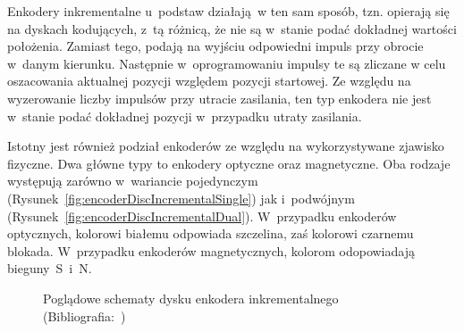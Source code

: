 Enkodery inkrementalne u~podstaw działają~w ten sam sposób, tzn. opierają się na dyskach kodujących, z~tą różnicą, że nie są w~stanie podać dokładnej wartości położenia. Zamiast tego, podają na wyjściu odpowiedni impuls przy obrocie w~danym kierunku. Następnie w~oprogramowaniu impulsy te są zliczane w celu oszacowania aktualnej pozycji względem pozycji startowej. Ze względu na wyzerowanie liczby impulsów przy utracie zasilania, ten typ enkodera nie jest w~stanie podać dokładnej pozycji w~przypadku utraty zasilania.

Istotny jest również podział enkoderów ze względu na wykorzystywane zjawisko fizyczne. Dwa główne typy to enkodery optyczne oraz magnetyczne. Oba rodzaje występują zarówno w~wariancie pojedynczym (Rysunek~\ref{fig:encoderDiscIncrementalSingle}) jak i~podwójnym (Rysunek~\ref{fig:encoderDiscIncrementalDual}). W~przypadku enkoderów optycznych, kolorowi białemu odpowiada szczelina, zaś kolorowi czarnemu blokada. W~przypadku enkoderów magnetycznych, kolorom odopowiadają bieguny~S~i~N.
\vspace*{-0.9cm}
\begin{figure}[!h]
    \centering
    \qquad
    \caption{Poglądowe schematy dysku enkodera inkrementalnego (Bibliografia:~\cite{bib:tarczeenkoderowinkrementalnych})}
\end{figure}

